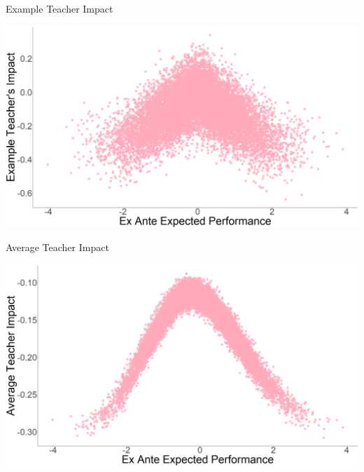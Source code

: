 \documentclass[t,aspectratio=169,11pt]{beamer}
\begin{document}

\begin{frame}{Example Teacher Impact} 

\centering

\includegraphics[width=.85\linewidth]{slides/Figures/teacher_impact_kernal_noise.png}

\end{frame}


\begin{frame}{Average Teacher Impact}

\centering

\includegraphics[width=.85\linewidth]{slides/Figures/Average_teacher_impact_kernal.png}

\end{frame}
\end{document}
